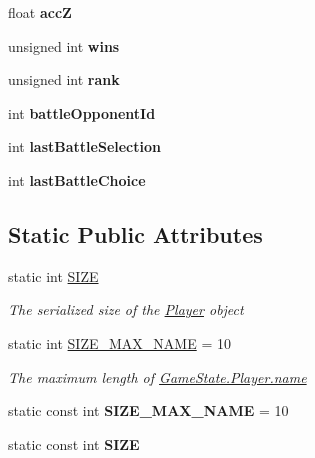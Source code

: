 \begin{DoxyCompactItemize}
\item 
\hypertarget{class_game_state_1_1_player_abec98fdec68ed34c3ff6bf202d4ac446}{float {\bfseries acc\-Z}}\label{class_game_state_1_1_player_abec98fdec68ed34c3ff6bf202d4ac446}

\item 
\hypertarget{class_game_state_1_1_player_aac7333a06ea194848f12090be762cdd6}{unsigned int {\bfseries wins}}\label{class_game_state_1_1_player_aac7333a06ea194848f12090be762cdd6}

\item 
\hypertarget{class_game_state_1_1_player_a43dd8a9e79c35d9615596fb6ab25d653}{unsigned int {\bfseries rank}}\label{class_game_state_1_1_player_a43dd8a9e79c35d9615596fb6ab25d653}

\item 
\hypertarget{class_game_state_1_1_player_ae60a4f411ef984c6d649d98c65b274bd}{int {\bfseries battle\-Opponent\-Id}}\label{class_game_state_1_1_player_ae60a4f411ef984c6d649d98c65b274bd}

\item 
\hypertarget{class_game_state_1_1_player_a2383ab7d3783c5122f3e68230069eb2e}{int {\bfseries last\-Battle\-Selection}}\label{class_game_state_1_1_player_a2383ab7d3783c5122f3e68230069eb2e}

\item 
\hypertarget{class_game_state_1_1_player_adf61e3258c2170b7b66355389cca541f}{int {\bfseries last\-Battle\-Choice}}\label{class_game_state_1_1_player_adf61e3258c2170b7b66355389cca541f}

\end{DoxyCompactItemize}
\subsection*{Static Public Attributes}
\begin{DoxyCompactItemize}
\item 
static int \hyperlink{class_game_state_1_1_player_ada2d068d3d5f973f73abac805c162d17}{S\-I\-Z\-E}
\begin{DoxyCompactList}\small\item\em The serialized size of the \hyperlink{class_game_state_1_1_player}{Player} object \end{DoxyCompactList}\item 
static int \hyperlink{class_game_state_1_1_player_a1cdc9de8183b220e87632f7f6a7147d0}{S\-I\-Z\-E\-\_\-\-M\-A\-X\-\_\-\-N\-A\-M\-E} = 10
\begin{DoxyCompactList}\small\item\em The maximum length of \hyperlink{class_game_state_1_1_player_afc2b145df544ca5bffc7c87ef294bcde}{Game\-State.\-Player.\-name} \end{DoxyCompactList}\item 
\hypertarget{class_game_state_1_1_player_a16d0264ca6adfedb582e22f59a550fc5}{static const int {\bfseries S\-I\-Z\-E\-\_\-\-M\-A\-X\-\_\-\-N\-A\-M\-E} = 10}\label{class_game_state_1_1_player_a16d0264ca6adfedb582e22f59a550fc5}

\item 
static const int {\bfseries S\-I\-Z\-E}
\end{DoxyCompactItemize}

